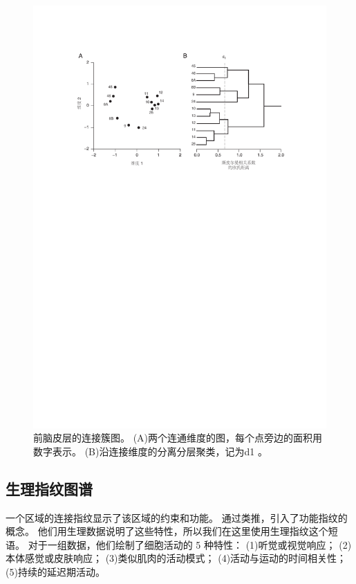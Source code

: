 \begin{figure}[!htb]
	\centering
	\includegraphics[width=0.8\linewidth]{chap1/1_7}
	\caption{前脑皮层的连接簇图。
		(A)两个连通维度的图，每个点旁边的面积用数字表示。
		(B)沿连接维度的分离分层聚类，记为d1 \cite{2002Dorsal}。\label{fig:1_7}}
\end{figure}


\subsection{生理指纹图谱}

一个区域的连接指纹显示了该区域的约束和功能。
通过类推，引入了功能指纹的概念\cite{2002Dorsal}。
他们用生理数据说明了这些特性，所以我们在这里使用生理指纹这个短语。
对于一组数据，他们绘制了细胞活动的 5 种特性： 
(1)听觉或视觉响应；
(2)本体感觉或皮肤响应；
(3)类似肌肉的活动模式；
(4)活动与运动的时间相关性；
(5)持续的延迟期活动。

